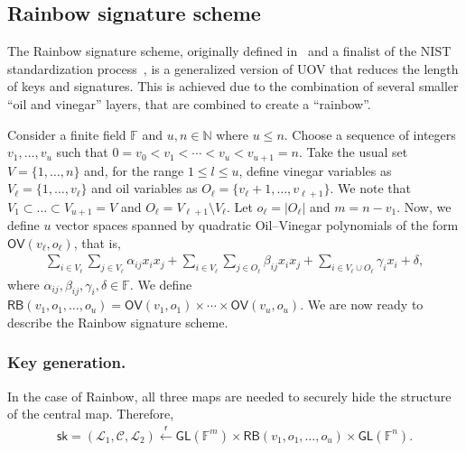 \documentclass[12pt, a4paper, oneside]{memoir}
\newcommand{\random}{\overset{\mathsf{r}}{\gets}}
\theoremstyle{definition}
\begin{document}
\subsection{Rainbow signature scheme}\label{subsec:rainbow}

The Rainbow signature scheme, originally defined in~\cite{Ding:200506} and a finalist of the NIST standardization process~\cite[Section~3.20]{Alagic:202007}, is a generalized version of UOV that reduces the length of keys and signatures. This is achieved due to the combination of several smaller ``oil and vinegar'' layers, that are combined to create a ``rainbow''.

Consider a finite field $\mathbb{F}$ and $u, n \in \mathbb{N}$ where $u \leq n$. Choose a sequence of integers $v_{1}, \dots, v_{u}$ such that $0 = v_{0} < v_{1} < \cdots < v_{u} < v_{u + 1} = n$. Take the usual set $V = \{1, \dots, n\}$ and, for the range $1 \leq l \leq u$, define vinegar variables as $V_{\ell} = \{1, \dots, v_{\ell}\}$ and oil variables as $O_{\ell} = \{v_{\ell} + 1, \dots, v_{\ell + 1}\}$. We note that $V_{1} \subset \dots \subset V_{u + 1} = V$ and $O_{\ell} = V_{\ell + 1} \setminus V_{\ell}$. Let $o_{\ell} = |O_{\ell}|$ and $m = n - v_{1}$. Now, we define $u$ vector spaces spanned by quadratic Oil--Vinegar polynomials of the form $\mathsf{OV}(v_{\ell}, o_{\ell})$, that is,
\begin{align}\label{eq:oil-vinegar-space}
  \sum_{i \in V_{\ell}} \sum_{j \in V_{\ell}} \alpha_{ij} x_{i} x_{j}
    + \sum_{i \in V_{\ell}} \sum_{j \in O_{\ell}} \beta_{ij} x_{i} x_{j}
    + \sum_{i \in V_{\ell} \cup O_{\ell}} \gamma_{i} x_{i} + \delta,
\end{align}
where $\alpha_{ij}, \beta_{ij}, \gamma_{i}, \delta \in \mathbb{F}$. We define $\mathsf{RB}(v_{1}, o_{1}, \dots, o_{u}) = \mathsf{OV}(v_{1}, o_{1}) \times \cdots \times \mathsf{OV}(v_{u}, o_{u})$. We are now ready to describe the Rainbow signature scheme.

\subsubsection{Key generation.}

In the case of Rainbow, all three maps are needed to securely hide the structure of the central map. Therefore,
\begin{align}\label{eq:sk-rainbow}
  \mathsf{sk} = (\mathcal{L}_{1}, \mathcal{C}, \mathcal{L}_{2}) 
    \random \mathsf{GL}(\mathbb{F}^{m}) \times \mathsf{RB}(v_{1}, o_{1}, \dots, o_{u}) \times \mathsf{GL}(\mathbb{F}^{n}).
\end{align}
\end{document}
